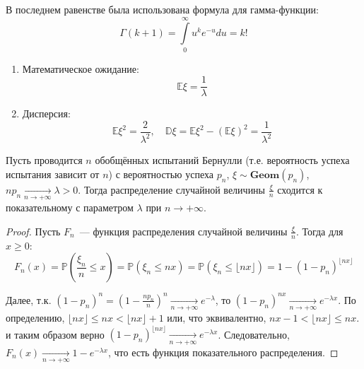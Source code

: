 В последнем равенстве была использована формула для гамма-функции:
\begin{equation*}
    \Gamma(k+1)=\int\limits_{0}^{\infty} u^{k} e^{-u} d u=k !
\end{equation*}
\begin{enumerate}
    \item Математическое ожидание:
    \begin{equation*}
        \mathbb{E} \xi=\frac{1}{\lambda}
    \end{equation*}
    \item Дисперсия:
    \begin{equation*}
        \mathbb{E} \xi^{2}=\frac{2}{\lambda^{2}}, \quad \mathbb{D} \xi=\mathbb{E} \xi^{2}-(\mathbb{E} \xi)^{2}=\frac{1}{\lambda^{2}}
    \end{equation*}
\end{enumerate}

\begin{thm*}
    Пусть проводится $n$ обобщённых испытаний Бернулли (т.е. вероятность успеха испытания зависит от $n$) с вероятностью успеха $p_n$, $\xi \sim \mathbf{Geom}(p_n)$, $n p_{n} \underset{n \to +\infty}{\longrightarrow} \lambda > 0$. Тогда распределение случайной величины $\frac{\xi}{n}$ сходится к показательному с параметром $\lambda$ при $n \to +\infty$.
\end{thm*}

\begin{proof}
    Пусть $F_n$~--- функция распределения случайной величины $\frac{\xi}{n}$. Тогда для $x \geqslant 0$:
    \begin{equation*}
        F_{n}(x)=\mathbb{P}\left(\frac{\xi_{n}}{n} \leqslant x\right)=\mathbb{P}\left(\xi_{n} \leqslant n x\right)=\mathbb{P}\left(\xi_{n} \leq\lfloor n x\rfloor\right)=1-\left(1-p_{n}\right)^{\lfloor n x\rfloor}
    \end{equation*}
    
    Далее, т.к. $\left(1-p_{n}\right)^{n}=\left(1-\frac{n p_{n}}{n}\right)^{n} \xrightarrow[n \to +\infty]{} e^{-\lambda}$, то $(1 - p_n)^{nx} \xrightarrow[n \to +\infty]{} e^{-\lambda x}.$ По определению, $\lfloor n x\rfloor \leqslant n x<\lfloor n x\rfloor+1$ или, что эквивалентно, $n x-1<\lfloor n x\rfloor \leqslant n x.$ и таким образом верно $(1 - p_n)^{\lfloor nx \rfloor} \xrightarrow[n \to +\infty]{} e^{-\lambda x}$. Следовательно, $F_n(x) \xrightarrow[n \to +\infty]{} 1 - e^{-\lambda x}$, что есть функция показательного распределения. 
\end{proof}

